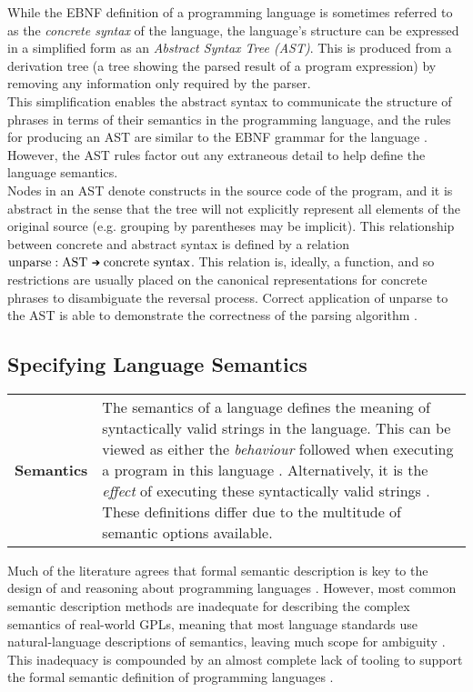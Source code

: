\documentclass[a4paper,11pt]{report}
\newcommand{\goesto}[0]{\MVRightarrow}
\newcommand{\mathgoesto}[0]{\mathord{\text{ \goesto\;}}}
\newcommand{\defblock}[3]{
    \begin{longtable}{l p{#1}} 
        \textbf{#2} & #3
    \end{longtable}
}
\begin{document}
While the EBNF definition of a programming language is sometimes referred to as the \textit{concrete syntax} of the language, the language's structure can be expressed in a simplified form as an \textit{Abstract Syntax Tree (AST)}.
This is produced from a derivation tree (a tree showing the parsed result of a program expression) by removing any information only required by the parser.\\

This simplification enables the abstract syntax to communicate the structure of phrases in terms of their semantics in the programming language, and the rules for producing an AST are similar to the EBNF grammar for the language \citep{slonneger1995formal}.
However, the AST rules factor out any extraneous detail to help define the language semantics. \\

Nodes in an AST denote constructs in the source code of the program, and it is abstract in the sense that the tree will not explicitly represent all elements of the original source (e.g. grouping by parentheses may be implicit). 
This relationship between concrete and abstract syntax is defined by a relation $\text{unparse} : \text{AST} \mathgoesto \text{concrete syntax}$.
This relation is, ideally, a function, and so restrictions are usually placed on the canonical representations for concrete phrases to disambiguate the reversal process. 
Correct application of unparse to the AST is able to demonstrate the correctness of the parsing algorithm \citep[pg. 29]{slonneger1995formal}.



\subsection{Specifying Language Semantics} %
\label{sub:specifying_language_semantics}
\defblock{11cm}{Semantics}{
    The semantics of a language defines the meaning of syntactically valid strings in the language.
    This can be viewed as either the \textit{behaviour} followed when executing a program in this language \citep{slonneger1995formal}.
    Alternatively, it is the \textit{effect} of executing these syntactically valid strings \citep{hennessy1990semantics}.
    These definitions differ due to the multitude of semantic options available. 
}

Much of the literature agrees that formal semantic description is key to the design of and reasoning about programming languages \citep{Zhang:2004:SSD:981009.981013,mosses1986use,Binsbergen:2016:TSC:2892664.2893464}.
However, most common semantic description methods are inadequate for describing the complex semantics of real-world GPLs, meaning that most language standards use natural-language descriptions of semantics, leaving much scope for ambiguity \citep{mosses1986use}.
This inadequacy is compounded by an almost complete lack of tooling to support the formal semantic definition of programming languages \citep{Binsbergen:2016:TSC:2892664.2893464}.\\
\end{document}
